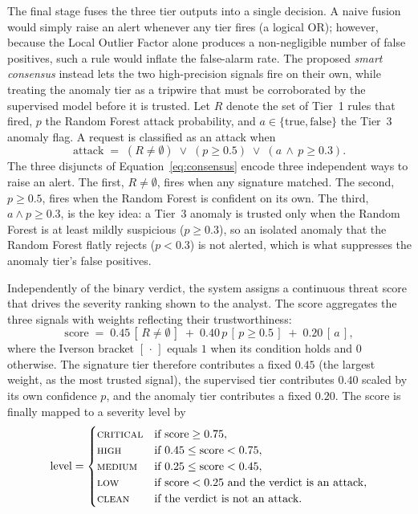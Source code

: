 \documentclass[12pt,a4paper]{report}
\begin{document}
The final stage fuses the three tier outputs into a single decision. A naive
fusion would simply raise an alert whenever any tier fires (a logical OR);
however, because the Local Outlier Factor alone produces a non-negligible
number of false positives, such a rule would inflate the false-alarm rate.
The proposed \emph{smart consensus} instead lets the two high-precision
signals fire on their own, while treating the anomaly tier as a tripwire
that must be corroborated by the supervised model before it is trusted. Let
$R$ denote the set of Tier~1 rules that fired, $p$ the Random Forest attack
probability, and $a \in \{\text{true},\text{false}\}$ the Tier~3 anomaly
flag. A request is classified as an attack when
\begin{equation}
  \mathrm{attack} \;=\; (R \neq \emptyset) \;\lor\; (p \geq 0.5) \;\lor\;
  (a \,\land\, p \geq 0.3).
  \label{eq:consensus}
\end{equation}
The three disjuncts of Equation~\eqref{eq:consensus} encode three
independent ways to raise an alert. The first, $R \neq \emptyset$, fires when
any signature matched. The second, $p \geq 0.5$, fires when the Random Forest
is confident on its own. The third, $a \land p \geq 0.3$, is the key idea: a
Tier~3 anomaly is trusted only when the Random Forest is at least mildly
suspicious ($p \geq 0.3$), so an isolated anomaly that the Random Forest
flatly rejects ($p < 0.3$) is not alerted, which is what suppresses the
anomaly tier's false positives.

Independently of the binary verdict, the system assigns a continuous threat
score that drives the severity ranking shown to the analyst. The score
aggregates the three signals with weights reflecting their trustworthiness:
\begin{equation}
  \mathrm{score} \;=\; 0.45\,[\,R \neq \emptyset\,] \;+\;
  0.40\,p\,[\,p \geq 0.5\,] \;+\; 0.20\,[\,a\,],
  \label{eq:score}
\end{equation}
where the Iverson bracket $[\,\cdot\,]$ equals $1$ when its condition holds
and $0$ otherwise. The signature tier therefore contributes a fixed $0.45$
(the largest weight, as the most trusted signal), the supervised tier
contributes $0.40$ scaled by its own confidence $p$, and the anomaly tier
contributes a fixed $0.20$. The score is finally mapped to a severity level
by
\begin{equation}
  \mathrm{level} =
  \begin{cases}
    \textsc{critical} & \text{if } \mathrm{score} \geq 0.75,\\
    \textsc{high}     & \text{if } 0.45 \leq \mathrm{score} < 0.75,\\
    \textsc{medium}   & \text{if } 0.25 \leq \mathrm{score} < 0.45,\\
    \textsc{low}      & \text{if } \mathrm{score} < 0.25 \text{ and the verdict is an attack},\\
    \textsc{clean}    & \text{if the verdict is not an attack.}
  \end{cases}
  \label{eq:severity}
\end{equation}
\end{document}
